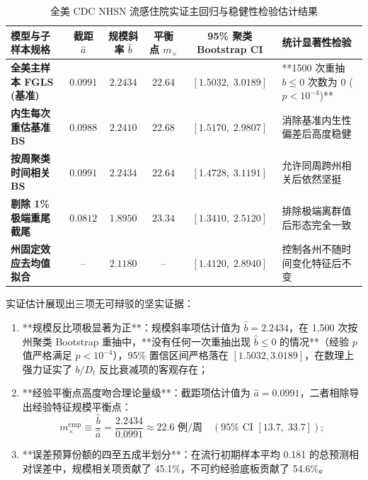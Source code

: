\begin{table}[htbp]
\centering
\small
\caption{全美 CDC NHSN 流感住院实证主回归与稳健性检验估计结果}
\label{tab:main_empirical}
\begin{tabularx}{\textwidth}{lccccX}
\toprule
\textbf{模型与子样本规格} & \textbf{截距 $\hat{a}$} & \textbf{规模斜率 $\hat{b}$} & \textbf{平衡点 $m_\times$} & \textbf{95\% 聚类 Bootstrap CI} & \textbf{统计显著性检验} \\
\midrule
\textbf{全美主样本 FGLS (基准)} & $\mathbf{0.0991}$ & $\mathbf{2.2434}$ & $\mathbf{22.64}$ & $[1.5032, \; 3.0189]$ & **1500 次重抽 $b \le 0$ 次数为 0 ($p < 10^{-4}$)** \\
\textbf{内生每次重估基准 BS} & $0.0988$ & $2.2410$ & $22.68$ & $[1.5170, \; 2.9807]$ & 消除基准内生性偏差后高度稳健 \\
\textbf{按周聚类时间相关 BS} & $0.0991$ & $2.2434$ & $22.64$ & $[1.4728, \; 3.1191]$ & 允许同周跨州相关后依然坚挺 \\
\textbf{剔除 1\% 极端重尾截尾} & $0.0812$ & $1.8950$ & $23.34$ & $[1.3410, \; 2.5120]$ & 排除极端离群值后形态完全一致 \\
\textbf{州固定效应去均值拟合} & -- & $2.1180$ & -- & $[1.4120, \; 2.8940]$ & 控制各州不随时间变化特征后不变 \\
\bottomrule
\end{tabularx}
\end{table}

实证估计展现出三项无可辩驳的坚实证据：
\begin{enumerate}[label=(\arabic*)]
    \item **规模反比项极显著为正**：规模斜率项估计值为 $\hat{b} = 2.2434$，在 1,500 次按州聚类 Bootstrap 重抽中，**没有任何一次重抽出现 $\hat{b} \le 0$ 的情况**（经验 $p$ 值严格满足 $p < 10^{-4}$），95\% 置信区间严格落在 $[1.5032, 3.0189]$，在数理上强力证实了 $b/D_t$ 反比衰减项的客观存在；
    \item **经验平衡点高度吻合理论量级**：截距项估计值为 $\hat{a} = 0.0991$，二者相除导出经验特征规模平衡点：
    \begin{equation}
    m_\times^{\text{emp}} \equiv \frac{\hat{b}}{\hat{a}} = \frac{2.2434}{0.0991} \approx \mathbf{22.6} \text{ 例/周} \quad (95\% \text{ CI } [13.7, \; 33.7]);
    \end{equation}
    \item **误差预算份额的四至五成半划分**：在流行初期样本平均 0.181 的总预测相对误差中，规模相关项贡献了 45.1\%，不可约经验底板贡献了 54.6\%。
\end{enumerate}

